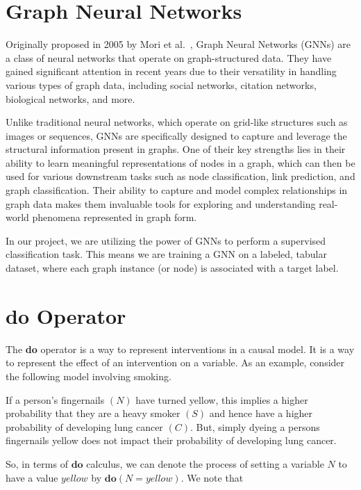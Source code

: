 \documentclass{article}
\begin{document}
\section{Graph Neural Networks}
\label{gnn}

Originally proposed in 2005 by Mori et al.~\cite{gori2005new}, Graph Neural Networks 
(GNNs) are a class of neural networks that operate on graph-structured data. 
They have gained significant attention in recent years due to their versatility 
in handling various types of graph data, including social networks, citation networks, 
biological networks, and more. 

Unlike traditional neural networks, which operate on 
grid-like structures such as images or sequences, GNNs are specifically designed to 
capture and leverage the structural information present in graphs. One of their 
key strengths lies in their ability to learn meaningful representations of nodes in a 
graph, which can then be used for various downstream tasks such as node classification, 
link prediction, and graph classification. Their ability to capture and model complex 
relationships in graph data makes them invaluable tools for exploring and understanding 
real-world phenomena represented in graph form.

In our project, we are utilizing the power of GNNs to perform a supervised classification
task. This means we are training a GNN on a labeled, tabular dataset, where each graph instance
(or node) is associated with a target label.



\section{$\textbf{do}$ Operator}
\label{do}

The \textbf{do} operator is a way to represent interventions in a causal model. 
It is a way to represent the effect of an intervention on a variable. As an example, 
consider the following model involving smoking.

If a person's fingernails $(N)$ have turned yellow, this implies a higher probability 
that they are a heavy smoker $(S)$ and hence have a higher probability of developing 
lung cancer $(C)$. But, simply dyeing a persons fingernails yellow does not impact 
their probability of developing lung cancer. 

So, in terms of $\textbf{do}$ calculus, we can denote the process of setting a 
variable $N$ to have a value $\textit{yellow}$ by $\textbf{do}(N = \textit{yellow})$. 
We note that 
\end{document}
